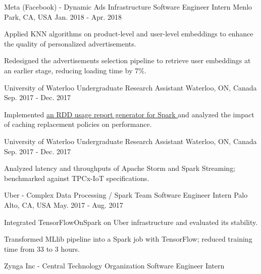 \begin{cventries}
{}
\cventry
{Meta (Facebook) - Dynamic Ads Infrastructure} %
{Software Engineer Intern} %
{Menlo Park, CA, USA} %
{Jan. 2018 - Apr. 2018} %
{ %
\begin{cvitems}
\item {Applied KNN algorithms on product-level and user-level embeddings to enhance the quality of personalized advertisements.}
\item {Redesigned the advertisements selection pipeline to retrieve user embeddings at an earlier stage, reducing loading time by 7\%.}
\end{cvitems}
}
\cventry
{University of Waterloo} %
{Undergraduate Research Assistant} %
{Waterloo, ON, Canada} %
{Sep. 2017 - Dec. 2017} %
{ %
\begin{cvitems}
\item {Implemented \href{https://github.com/ljj7975/CachedRDDReportGenerator}{an RDD usage report generator for Spark {\small \faGithub}} and analyzed the impact of caching replacement policies on performance.}
\end{cvitems}
}
\cventry
{University of Waterloo} %
{Undergraduate Research Assistant} %
{Waterloo, ON, Canada} %
{Sep. 2017 - Dec. 2017} %
{ %
\begin{cvitems}
\item {Analyzed latency and throughputs of Apache Storm and Spark Streaming; benchmarked against TPCx-IoT specifications.}
\end{cvitems}
}
\cventry
{Uber - Complex Data Processing / Spark Team} %
{Software Engineer Intern} %
{Palo Alto, CA, USA} %
{May. 2017 - Aug. 2017} %
{ %
\begin{cvitems}
\item {Integrated TensorFlowOnSpark on Uber infrastructure and evaluated its stability.}
\item {Transformed MLlib pipeline into a Spark job with TensorFlow; reduced training time from 33 to 3 hours.}
\end{cvitems}
}
\cventry
{Zynga Inc - Central Technology Organization} %
{Software Engineer Intern} %

\end{cventries}
